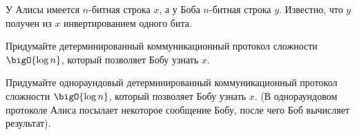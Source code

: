 У Алисы имеется $n$-битная строка $x$, а у Боба $n$-битная строка $y$.
Известно, что $y$ получен из $x$ инвертированием одного бита.
\begin{enumcyr}
    \item Придумайте детерминированный коммуникационный протокол сложности $\bigO{\log n}$, который позволяет
        Бобу узнать $x$.
    \item Придумайте однораундовый детерминированный коммуникационный протокол сложности $\bigO{\log n}$,
        который позволяет Бобу узнать $x$. (В однораундовом протоколе Алиса посылает некоторое сообщение
        Бобу, после чего Боб вычисляет результат).
\end{enumcyr}